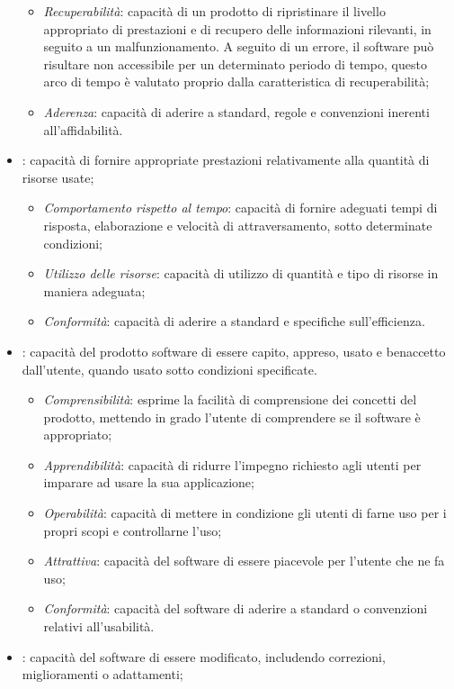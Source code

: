 \begin{itemize}
\begin{itemize}
\item \emph{Recuperabilità}: capacità di un prodotto di ripristinare il livello appropriato di prestazioni e di recupero delle informazioni rilevanti, in seguito a un malfunzionamento. A seguito di un errore, il software può risultare non accessibile per un determinato periodo di tempo, questo arco di tempo è valutato proprio dalla caratteristica di recuperabilità;
\item \emph{Aderenza}: capacità di aderire a standard, regole e convenzioni inerenti all'affidabilità.
\end{itemize}
\item {}: capacità di fornire appropriate prestazioni relativamente alla quantità di risorse usate;
\begin{itemize}
\item \emph{Comportamento rispetto al tempo}: capacità di fornire adeguati tempi di risposta, elaborazione e velocità di attraversamento, sotto determinate condizioni;
\item \emph{Utilizzo delle risorse}: capacità di utilizzo di quantità e tipo di risorse in maniera adeguata;
\item \emph{Conformità}: capacità di aderire a standard e specifiche sull'efficienza.
\end{itemize}
\item {}: capacità del prodotto software di essere capito, appreso, usato e benaccetto dall'utente, quando usato sotto condizioni specificate.
\begin{itemize}
\item \emph{Comprensibilità}: esprime la facilità di comprensione dei concetti del prodotto, mettendo in grado l'utente di comprendere se il software è appropriato;
\item \emph{Apprendibilità}: capacità di ridurre l'impegno richiesto agli utenti per imparare ad usare la sua applicazione;
\item \emph{Operabilità}: capacità di mettere in condizione gli utenti di farne uso per i propri scopi e controllarne l'uso;
\item \emph{Attrattiva}: capacità del software di essere piacevole per l'utente che ne fa uso;
\item \emph{Conformità}: capacità del software di aderire a standard o convenzioni relativi all'usabilità.
\end{itemize}
\item {}: capacità del software di essere modificato, includendo correzioni, miglioramenti o adattamenti;

\end{itemize}
